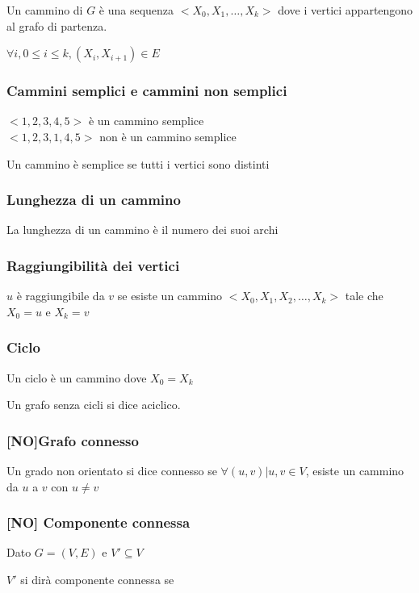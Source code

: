 \documentclass{article}
\begin{document}
{Un cammino di $G$ è una sequenza $<X_0,X_1,\ldots,X_k>$ dove i vertici appartengono al grafo di partenza.}

$\forall i,0\leq i\leq k,(X_i,X_{i+1})\in E$

\subsubsection{Cammini semplici e cammini non semplici}

$<1,2,3,4,5>$ è un cammino semplice\\
$<1,2,3,1,4,5>$ non è un cammino semplice

{Un cammino è semplice se tutti i vertici sono distinti}

\subsubsection{Lunghezza di un cammino}

{La lunghezza di un cammino è il numero dei suoi archi}

\subsubsection{Raggiungibilità dei vertici}

$u$ è raggiungibile da $v$ se esiste un cammino $<X_0,X_1,X_2,\ldots,X_k>$ tale che $X_0 = u$ e $X_k = v$

\subsubsection{Ciclo}

{Un ciclo è un cammino dove $X_0 = X_k$}

{Un grafo senza cicli si dice aciclico.}

\subsubsection{{[}NO{]}Grafo connesso}

{Un grado non orientato si dice connesso se $\forall (u,v) | u,v \in V$, esiste un cammino da $u$ a $v$ con $u\neq v$}

\subsubsection{{[}NO{]} Componente connessa}

{Dato $G=(V,E)$ e $V' \subseteq V$}

{$V'$ si dirà componente connessa se }
\end{document}
